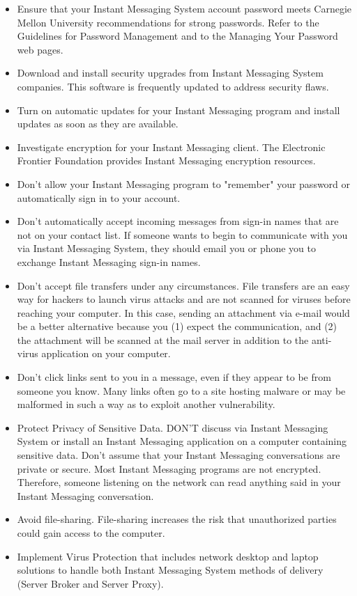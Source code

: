\begin{itemize}
    \item Ensure that your Instant Messaging System account password meets Carnegie Mellon
    University recommendations for strong passwords.
    Refer to the Guidelines for Password Management and to the Managing Your Password web pages.
    \item Download and install security upgrades from Instant Messaging System companies.
    This software is frequently updated to address security flaws.
    \item Turn on automatic updates for your Instant Messaging program and install updates as soon as they are available.
    \item Investigate encryption for your Instant Messaging client.
    The Electronic Frontier Foundation provides Instant Messaging encryption resources.
    \item Don't allow your Instant Messaging program to "remember" your password or automatically sign in to your account.
    \item Don't automatically accept incoming messages from sign-in names that are not on your contact list.
    If someone wants to begin to communicate with you via Instant Messaging System,
    they should email you or phone you to exchange Instant Messaging sign-in names.
    \item Don't accept file transfers under any circumstances.
    File transfers are an easy way for hackers to launch virus attacks and are not scanned for viruses before reaching your computer.
    In this case, sending an attachment via e-mail would be a better alternative because you (1) expect the communication, and (2)
    the attachment will be scanned at the mail server in addition to the anti-virus application on your computer.
    \item Don't click links sent to you in a message, even if they appear to be from someone you know.
    Many links often go to a site hosting malware or may be malformed in such a way as to exploit another vulnerability.
    \item Protect Privacy of Sensitive Data.
    DON'T discuss via Instant Messaging System or install an Instant Messaging application on a computer containing sensitive data.
    Don't assume that your Instant Messaging conversations are private or secure.
    Most Instant Messaging programs are not encrypted.
    Therefore, someone listening on the network can read anything said in your Instant Messaging conversation.
    \item Avoid file-sharing.
    File-sharing increases the risk that unauthorized parties could gain access to the computer.
    \item Implement Virus Protection that includes network desktop and laptop solutions to handle both Instant Messaging System
    methods of delivery (Server Broker and Server Proxy).
\end{itemize}